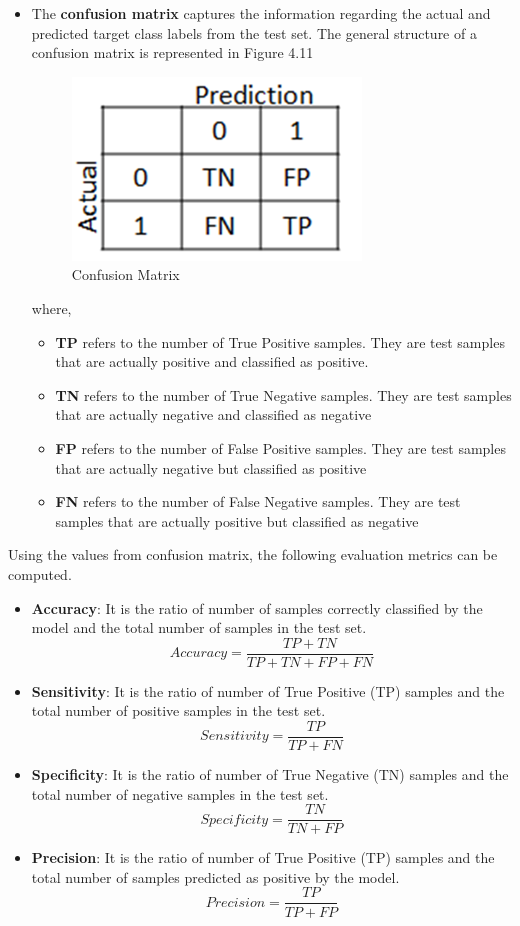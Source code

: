 \begin{itemize}
    \item The \textbf{confusion matrix} captures the information regarding the actual and predicted target class labels from the test set. The general structure of a confusion matrix is represented in Figure 4.11
    \newpage
    \begin{figure}[h]
    \centering
    \includegraphics[scale=1.0]{cm.PNG}
    \caption{\label{fig:subBDDs1}Confusion Matrix}
    \end{figure}
    where,
    \begin{itemize}
        \item \textbf{TP} refers to the number of True Positive samples. They are test samples that are actually positive and classified as positive.
        \item \textbf{TN} refers to the number of True Negative samples. They are test samples that are actually negative and classified as negative
        \item \textbf{FP} refers to the number of False Positive samples. They are test samples that are actually negative but classified as positive
        \item \textbf{FN} refers to the number of False Negative samples. They are test samples that are actually positive but classified as negative
    \end{itemize}
\end{itemize}
Using the values from confusion matrix, the following evaluation metrics can be computed.
\begin{itemize}
    \item \textbf{Accuracy}: It is the ratio of number of samples correctly classified by the model and the total number of samples in the test set.
    \[
        Accuracy = \dfrac{TP+TN}{TP+TN+FP+FN}
    \]
    
    \item \textbf{Sensitivity}: It is the ratio of number of True Positive (TP) samples and the total number of positive samples in the test set.
    \[
        Sensitivity = \dfrac{TP}{TP+FN}
    \]
    
    \item \textbf{Specificity}:  It is the ratio of number of True Negative (TN) samples and the total number of negative samples in the test set.
    \[
        Specificity = \dfrac{TN}{TN+FP}
    \]
    \item \textbf{Precision}:  It is the ratio of number of True Positive (TP) samples and the total number of samples predicted as positive by the model.
    \[
        Precision = \dfrac{TP}{TP+FP}
    \]
\end{itemize}